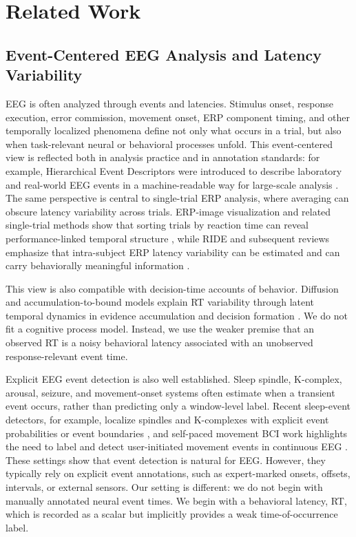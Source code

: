 \section{Related Work}

\subsection{Event-Centered EEG Analysis and Latency Variability}

EEG is often analyzed through events and latencies. Stimulus onset, response execution, error commission, movement onset, ERP component timing, and other temporally localized phenomena define not only what occurs in a trial, but also when task-relevant neural or behavioral processes unfold. This event-centered view is reflected both in analysis practice and in annotation standards: for example, Hierarchical Event Descriptors were introduced to describe laboratory and real-world EEG events in a machine-readable way for large-scale analysis \citep{BigdelyShamlo2016HED}. The same perspective is central to single-trial ERP analysis, where averaging can obscure latency variability across trials. ERP-image visualization and related single-trial methods show that sorting trials by reaction time can reveal performance-linked temporal structure \citep{Jung1998}, while RIDE and subsequent reviews emphasize that intra-subject ERP latency variability can be estimated and can carry behaviorally meaningful information \citep{Ouyang2011RIDE,Ouyang2017}.

This view is also compatible with decision-time accounts of behavior. Diffusion and accumulation-to-bound models explain RT variability through latent temporal dynamics in evidence accumulation and decision formation \citep{Ratcliff2008,OConnell2012,Kelly2013}. We do not fit a cognitive process model. Instead, we use the weaker premise that an observed RT is a noisy behavioral latency associated with an unobserved response-relevant event time.

Explicit EEG event detection is also well established. Sleep spindle, K-complex, arousal, seizure, and movement-onset systems often estimate when a transient event occurs, rather than predicting only a window-level label. Recent sleep-event detectors, for example, localize spindles and K-complexes with explicit event probabilities or event boundaries \citep{Chambon2019DOSED,TapiaRivas2024SEED}, and self-paced movement BCI work highlights the need to label and detect user-initiated movement events in continuous EEG \citep{Zhang2023SelfPacedMovementBCI}. These settings show that event detection is natural for EEG. However, they typically rely on explicit event annotations, such as expert-marked onsets, offsets, intervals, or external sensors. Our setting is different: we do not begin with manually annotated neural event times. We begin with a behavioral latency, RT, which is recorded as a scalar but implicitly provides a weak time-of-occurrence label.

